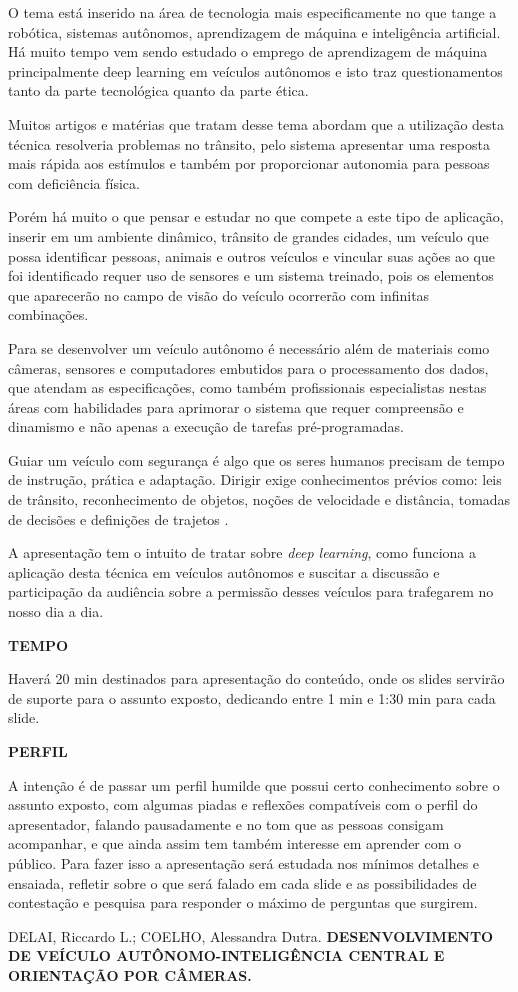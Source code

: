 \documentclass[12pt,a4paper]{article}
\begin{document}
    \par O tema está inserido na área de tecnologia mais especificamente no que tange a robótica, sistemas autônomos, aprendizagem de máquina e inteligência artificial. Há muito tempo vem sendo estudado o emprego de aprendizagem de máquina principalmente deep learning em veículos autônomos e isto traz questionamentos tanto da parte tecnológica quanto da parte ética.
    \par Muitos artigos e matérias que tratam desse tema abordam que a utilização desta técnica resolveria problemas no trânsito, pelo sistema apresentar uma resposta mais rápida aos estímulos e também por proporcionar autonomia para pessoas com deficiência física.
    \par Porém há muito o que pensar e estudar no que compete a este tipo de aplicação, inserir em um ambiente dinâmico, trânsito de grandes cidades, um veículo que possa identificar pessoas, animais e outros veículos e vincular suas ações ao que foi identificado requer uso de sensores e um sistema treinado, pois os elementos que aparecerão no campo de visão do veículo ocorrerão com infinitas combinações.
    \par Para se desenvolver um veículo autônomo é necessário além de materiais como câmeras, sensores e computadores embutidos para o processamento dos dados, que atendam as especificações, como também profissionais especialistas nestas áreas com habilidades para aprimorar o sistema que requer compreensão e dinamismo e não apenas a execução de tarefas pré-programadas.
    \par Guiar um veículo com segurança é algo que os seres humanos precisam de tempo de instrução, prática e adaptação. Dirigir exige conhecimentos prévios como: leis de trânsito, reconhecimento de objetos, noções de velocidade e distância, tomadas de decisões e definições de trajetos \cite{1}.
    \par A apresentação tem o intuito de tratar sobre \emph{deep learning}, como funciona a aplicação desta técnica em veículos autônomos e suscitar a discussão e participação da audiência sobre a permissão desses veículos para trafegarem no nosso dia a dia.

    \textbf{TEMPO}
    \par Haverá 20 min destinados para apresentação do conteúdo, onde os slides servirão de suporte para o assunto exposto, dedicando entre 1 min e 1:30 min para cada slide.  
    
    \textbf{PERFIL}
    \par A intenção é de passar um perfil humilde que possui certo conhecimento sobre o assunto exposto, com algumas piadas e reflexões compatíveis com o perfil do apresentador, falando pausadamente e no tom que as pessoas consigam acompanhar, e que ainda assim tem também interesse em aprender com o público. Para fazer isso a apresentação será estudada nos mínimos detalhes e ensaiada, refletir sobre o que será falado em cada slide e as possibilidades de contestação e pesquisa para responder o máximo de perguntas que surgirem.


     
    \begin{thebibliography}{BIBLIOGRAFIA}
 
         DELAI, Riccardo L.; COELHO, Alessandra Dutra. \textbf{DESENVOLVIMENTO DE VEÍCULO AUTÔNOMO-INTELIGÊNCIA CENTRAL E ORIENTAÇÃO POR CÂMERAS.}
    
    \end{thebibliography}
\end{document}
